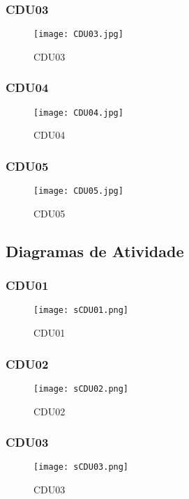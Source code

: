 \begin{landscape}
\subsubsection{CDU03}
\begin{figure}[htb]
	\centering
	\texttt{[image: CDU03.jpg]}
	\caption{CDU03}
\end{figure}
\clearpage
%
\subsubsection{CDU04}
\begin{figure}[htb]
	\centering
	\texttt{[image: CDU04.jpg]}
	\caption{CDU04}
\end{figure}
\clearpage
%
\subsubsection{CDU05}
\begin{figure}[htb]
	\centering
	\texttt{[image: CDU05.jpg]}
	\caption{CDU05}
\end{figure}
\clearpage

\subsection{Diagramas de Atividade}
\subsubsection{CDU01}
\begin{figure}[htb]
	\centering
	\texttt{[image: sCDU01.png]}
	\caption{CDU01}
\end{figure}
\clearpage
%
\subsubsection{CDU02}
\begin{figure}[htb]
	\centering
	\texttt{[image: sCDU02.png]}
	\caption{CDU02}
\end{figure}
\clearpage
%
\subsubsection{CDU03}
\begin{figure}[htb]
	\centering
	\texttt{[image: sCDU03.png]}
	\caption{CDU03}
\end{figure}
\clearpage
%

\end{landscape}
